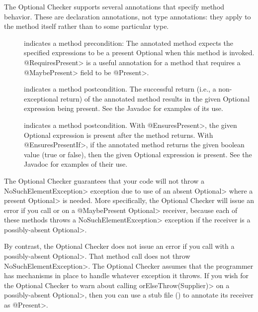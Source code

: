 The Optional Checker supports several annotations that specify method
behavior.  These are declaration annotations, not type annotations:  they
apply to the method itself rather than to some particular type.

\begin{description}

\item[]
  indicates a method precondition:  The annotated method expects the
  specified expressions to be a present Optional when this
  method is invoked. \<@RequiresPresent> is a useful annotation for a method
  that requires a \<@MaybePresent> field to be \<@Present>.
\item[]
  indicates a method postcondition.
  The successful return (i.e., a non-exceptional return) of the annotated
  method results in the given Optional expression being present. See the Javadoc
  for examples of its use.
\item[]
  indicates a method postcondition.  With \<@EnsuresPresent>, the given
  Optional expression is present after the method returns.  With
  \<@EnsuresPresentIf>, if the annotated
  method returns the given boolean value (true or false), then the given
  Optional expression is present. See the Javadoc for examples of their use.

\end{description}



The Optional Checker guarantees that your code will not throw a \<NoSuchElementException> exception
due to use of an absent \<Optional> where a present \<Optional> is needed.
More specifically, the Optional Checker will issue an error if you call
or
on a \<@MaybePresent Optional> receiver, because each of these methods
throws a \<NoSuchElementException> exception if the receiver is a possibly-absent
\<Optional>.

By contrast, the Optional Checker does not issue an error if you call
with a possibly-absent \<Optional>.  That method call does not
throw \<NoSuchElementException>.  The Optional Checker assumes that the
programmer has mechanisms in place to handle whatever exception it throws.
If you wish for the Optional Checker to warn about calling
\<orElseThrow(Supplier)> on a possibly-absent \<Optional>, then you can use
a stub file () to annotate its receiver as \<@Present>.

